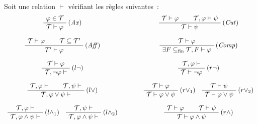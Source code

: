 \begin{theorem}\label{thm.completude.gen}
  Soit une relation $\vdash$ vérifiant les règles suivantes~:
  \[\begin{array}{ccc}
  \AxiomC{$\varphi \in \mathcal T$}
  \RightLabel{(\textit{Ax})}
  \UnaryInfC{$\mathcal T \vdash \varphi$}
  \DisplayProof
  & \qquad &
  \AxiomC{$\mathcal T \vdash \varphi$}
  \AxiomC{$\mathcal T, \varphi \vdash \psi$}
  \RightLabel{(\textit{Cut})}
  \BinaryInfC{$\mathcal T \vdash \psi$}
  \DisplayProof
  \\
  \\
  \AxiomC{$\mathcal T \vdash \varphi$}
  \AxiomC{$\mathcal T \subseteq \mathcal T'$}
  \RightLabel{(\textit{Aff})}
  \BinaryInfC{$\mathcal T' \vdash \varphi$}
  \DisplayProof
  & &
  \AxiomC{$\mathcal T \vdash \varphi$}
  \RightLabel{(\textit{Comp})}
  \UnaryInfC{$\exists F \subfin \mathcal T, F\vdash \varphi$}
  \DisplayProof
  \\
  \\
  \AxiomC{$\mathcal T\vdash \varphi$}
  \RightLabel{$(l\lnot)$}
  \UnaryInfC{$\mathcal T, \lnot\varphi\vdash$}
  \DisplayProof
  & &
  \AxiomC{$\mathcal T, \varphi \vdash$}
  \RightLabel{$(r\lnot)$}
  \UnaryInfC{$\mathcal T\vdash \lnot \varphi$}
  \DisplayProof
  \\
  \\
  \AxiomC{$\mathcal T, \varphi \vdash$}
  \AxiomC{$\mathcal T, \psi \vdash$}
  \RightLabel{$(l\lor)$}
  \BinaryInfC{$\mathcal T, \varphi\lor\psi\vdash$}
  \DisplayProof
  & &
  \AxiomC{$\mathcal T \vdash \varphi$}
  \RightLabel{$(r\lor_1)$}
  \UnaryInfC{$\mathcal T\vdash \varphi\lor\psi$}
  \DisplayProof
  \quad
  \AxiomC{$\mathcal T \vdash \psi$}
  \RightLabel{$(r\lor_2)$}
  \UnaryInfC{$\mathcal T\vdash \varphi \lor \psi$}
  \DisplayProof
  \\
  \\
  \AxiomC{$\mathcal T, \varphi \vdash$}
  \RightLabel{$(l\land_1)$}
  \UnaryInfC{$\mathcal T,\varphi\land\psi\vdash$}
  \DisplayProof
  \quad
  \AxiomC{$\mathcal T, \psi \vdash$}
  \RightLabel{$(l\land_2)$}
  \UnaryInfC{$\mathcal T,\varphi \land \psi\vdash$}
  \DisplayProof
  & &
  \AxiomC{$\mathcal T\vdash \varphi$}
  \AxiomC{$\mathcal T \vdash \psi$}
  \RightLabel{$(r\land)$}
  \BinaryInfC{$\mathcal T\vdash \varphi\land\psi$}
  \DisplayProof
  \\
  \\
  \AxiomC{$\mathcal T \vdash \varphi$}
  \AxiomC{$\mathcal T, \psi \vdash$}
  \RightLabel{$(l\to)$}
  \BinaryInfC{$\mathcal T, \varphi\to\psi\vdash$}

\end{array}\]
\end{theorem}
